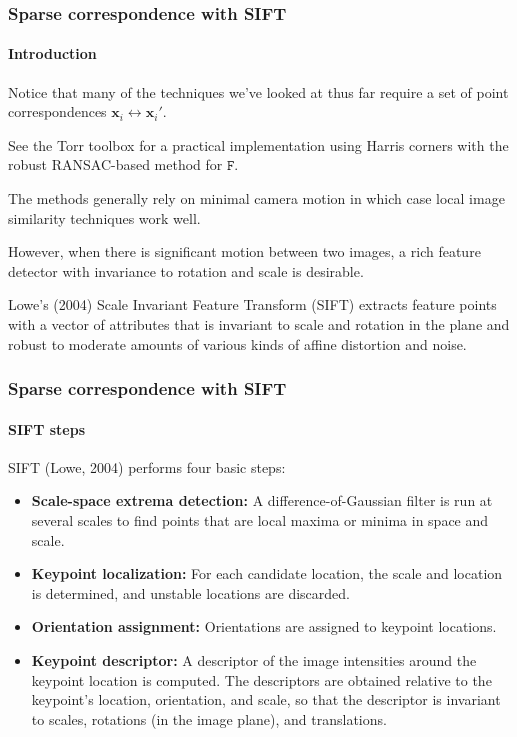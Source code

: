 \documentclass[aspectratio=169]{beamer}
\renewcommand{\vec}[1]{\boldsymbol{#1}}
\newcommand{\mat}[1]{\mathtt{#1}}
\begin{document}
\begin{frame}
\frametitle{Sparse correspondence with SIFT}
\framesubtitle{Introduction}

Notice that many of the techniques we've looked at thus far require a
set of \alert{point correspondences} $\vec{x}_i \leftrightarrow
\vec{x}_i'$.

\medskip

See the Torr toolbox for a practical implementation using \alert{Harris
corners} with the robust RANSAC-based method for $\mat{F}$.

\medskip

The methods generally rely on \alert{minimal camera motion} in which
case local image similarity techniques work well.

\medskip

However, when there is significant motion between two images, a
\alert{rich} feature detector with \alert{invariance to rotation and
scale} is desirable.

\medskip

Lowe's (2004) Scale Invariant Feature Transform (SIFT) extracts
feature points with a vector of attributes that is \alert{invariant}
to scale and rotation in the plane and \alert{robust} to moderate
amounts of various kinds of affine distortion and noise.

\end{frame}


\begin{frame}
\frametitle{Sparse correspondence with SIFT}
\framesubtitle{SIFT steps}

SIFT (Lowe, 2004) performs four basic steps:
\begin{itemize}
\item {\bf Scale-space extrema detection:} A difference-of-Gaussian
  filter is run at several scales to find points that are local maxima
  or minima in space \alert{and scale}.
\item {\bf Keypoint localization:} For each candidate location, the
  \alert{scale} and \alert{location} is determined, and unstable
  locations are discarded.
\item {\bf Orientation assignment:} \alert{Orientations} are assigned
  to keypoint locations.
\item {\bf Keypoint descriptor:} A descriptor of the image intensities
  around the keypoint location is computed.  The descriptors are
  obtained \alert{relative to the keypoint's location, orientation,
  and scale}, so that the descriptor is \alert{invariant} to scales,
  rotations (in the image plane), and translations.
\end{itemize}

\end{frame}
\end{document}
